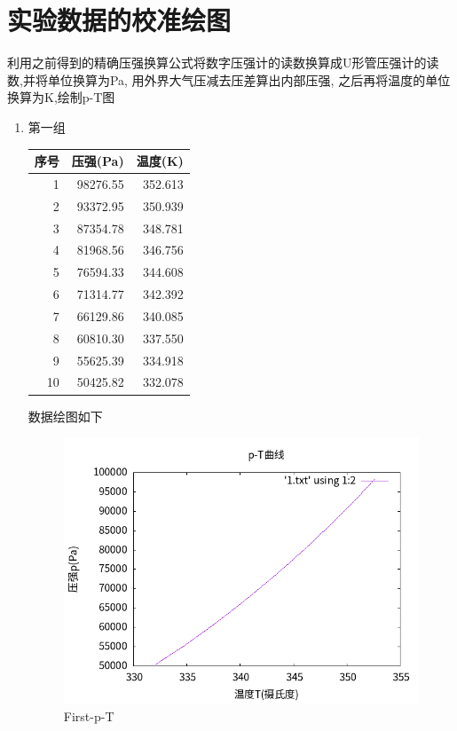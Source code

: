 \documentclass[11pt]{report}
\begin{document}
\section{实验数据的校准绘图}
\label{sec:orgf058d2d}
利用之前得到的精确压强换算公式将数字压强计的读数换算成U形管压强计的读数,并将单位换算为Pa,
用外界大气压减去压差算出内部压强,
之后再将温度的单位换算为K,绘制p-T图
\begin{enumerate}
\item 第一组
\label{sec:org0f10777}
\begin{center}
\begin{tabular}{rrr}
序号 & 压强(Pa) & 温度(K)\\
\hline
1 & 98276.55 & 352.613\\
2 & 93372.95 & 350.939\\
3 & 87354.78 & 348.781\\
4 & 81968.56 & 346.756\\
5 & 76594.33 & 344.608\\
6 & 71314.77 & 342.392\\
7 & 66129.86 & 340.085\\
8 & 60810.30 & 337.550\\
9 & 55625.39 & 334.918\\
10 & 50425.82 & 332.078\\
\end{tabular}
\end{center}

数据绘图如下
\begin{figure}[htbp]
\centering
\includegraphics[width=.9\linewidth]{../data/1.png}
\caption{First-p-T}
\end{figure}


\end{enumerate}
\end{document}
